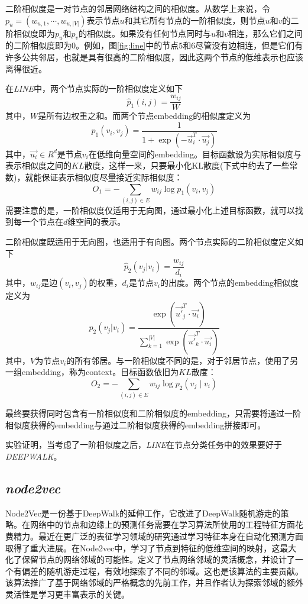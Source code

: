 二阶相似度是一对节点的邻居网络结构之间的相似度。从数学上来说，令$p_u=(w_{u, 1}, \cdots, w_{u,|V|})$表示节点$u$和其它所有节点的一阶相似度，则节点$u$和$v$的二阶相似度即为$p_u$和$p_v$的相似度。如果没有任何节点同时与$u$和$v$相连，那么它们之间的二阶相似度即为0。例如，图\ref{fig:line}中的节点$5$和$6$尽管没有边相连，但是它们有许多公共邻居，也就是具有很高的二阶相似度，因此这两个节点的低维表示也应该离得很近。

在\emph{LINE}中，两个节点实际的一阶相似度定义如下
\[\hat{p}_1(i, j) = \frac{w_{ij}}{W}\]
其中，$W$是所有边权重之和。而两个节点embedding的相似度定义为
\[p_1(v_i, v_j) = \frac{1}{1+ \exp(-\stackrel{\rightarrow}{u}_i^T\cdot \stackrel{\rightarrow}{u_j})}\]
其中，$\stackrel{\rightarrow}{u_i}\in R^d$是节点$v_i$在低维向量空间的embedding。目标函数设为实际相似度与表示相似度之间的$KL$散度，这样一来，只要最小化KL散度(下式中约去了一些常数)，就能保证表示相似度尽量接近实际相似度：
\[O_1 = -\sum_{(i, j)\in E}w_{ij}\log p_1(v_i, v_j)\]
需要注意的是，一阶相似度仅适用于无向图，通过最小化上述目标函数，就可以找到每一个节点在$d$维空间的表示。

二阶相似度既适用于无向图，也适用于有向图。两个节点实际的二阶相似度定义如下
\[\hat{p}_2(v_j|v_i) = \frac{w_{ij}}{d_i}\]
其中，$w_{ij}$是边$(v_i, v_j)$的权重，$d_i$是节点$v_i$的出度。两个节点的embedding相似度定义为
\[p_2(v_j|v_i) = \frac{\exp(\stackrel{\rightarrow}{u'}_j^T\cdot \stackrel{\rightarrow}{u_i})}{\sum_{k=1}^{|V|}\exp(\stackrel{\rightarrow}{u'}_k^T\cdot \stackrel{\rightarrow}{u_i})}\]
其中，$V$为节点$v_i$的所有邻居。与一阶相似度不同的是，对于邻居节点，使用了另一组embedding，称为context。目标函数依旧为$KL$散度：
\[O_2 = -\sum_{(i, j)\in E}w_{ij}\log p_2(v_j\mid v_i)\]

最终要获得同时包含有一阶相似度和二阶相似度的embedding，只需要将通过一阶相似度获得的embedding与通过二阶相似度获得的embedding拼接即可。

实验证明，当考虑了一阶相似度之后，\emph{LINE}在节点分类任务中的效果要好于\emph{DEEPWALK}。

\subsection{\emph{node2vec}}
Node2Vec\cite{grover2016node2vec}是一份基于DeepWalk的延伸工作，它改进了DeepWalk随机游走的策略。在网络中的节点和边缘上的预测任务需要在学习算法所使用的工程特征方面花费精力。最近在更广泛的表征学习领域的研究通过学习特征本身在自动化预测方面取得了重大进展。在Node2vec中，学习了节点到特征的低维空间的映射，这最大化了保留节点的网络邻域的可能性。定义了节点网络邻域的灵活概念，并设计了一个有偏差的随机游走过程，有效地探索了不同的邻域。这也是该算法的主要贡献。该算法推广了基于网络邻域的严格概念的先前工作，并且作者认为探索邻域的额外灵活性是学习更丰富表示的关键。


